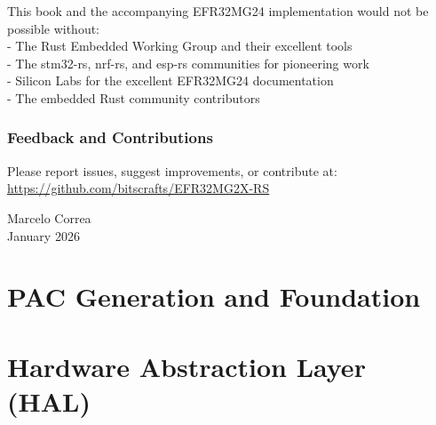\documentclass[11pt,a4paper,twoside,openright]{book}
\begin{document}
This book and the accompanying EFR32MG24 implementation would not be possible without:
\\- The Rust Embedded Working Group and their excellent tools
\\- The stm32-rs, nrf-rs, and esp-rs communities for pioneering work
\\- Silicon Labs for the excellent EFR32MG24 documentation
\\- The embedded Rust community contributors

\section*{Feedback and Contributions}

Please report issues, suggest improvements, or contribute at:
\\\url{https://github.com/bitscrafts/EFR32MG2X-RS}

\vspace*{2em}
\begin{flushright}
Marcelo Correa\\
January 2026
\end{flushright}

\clearpage

\mainmatter

\part{PAC Generation and Foundation}
\label{part:pac-foundation}







\part{Hardware Abstraction Layer (HAL)}
\label{part:hal}




\end{document}
